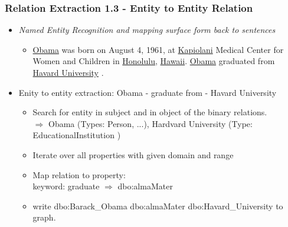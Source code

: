 \documentclass{beamer}
\begin{document}
\begin{frame}
\frametitle{Relation Extraction 1.3 - Entity to Entity Relation}
\begin{example}
	\begin{itemize}
		\item \textit{Named Entity Recognition and mapping surface form back to sentences} \\
		\begin{itemize} \item \underline{Obama} was born on August 4, 1961, at \underline{Kapiolani} Medical Center for Women and Children in \underline{Honolulu}, \underline{Hawaii}. \underline{Obama} graduated from \underline{Havard University} .
		\end{itemize}
		\item Enity to entity extraction: Obama - graduate from - Havard University \begin{itemize} \item Search for entity in subject and in object of the binary relations. \\ $\Rightarrow$ Obama (Types: Person, ...), Hardvard University (Type: EducationalInstitution )
			\item Iterate over all properties with given domain and range
			\item Map relation to property: \\ keyword: graduate $\Rightarrow$ dbo:almaMater
			\item write dbo:Barack\_Obama dbo:almaMater dbo:Havard\_University to graph.
		\end{itemize}		 

	\end{itemize}
\end{example}
\end{frame}
\end{document}
